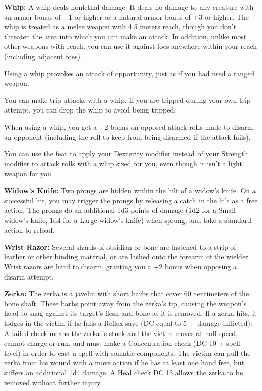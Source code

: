 \textbf{Whip:} A whip deals nonlethal damage. It deals no damage to any creature with an armor bonus of +1 or higher or a natural armor bonus of +3 or higher. The whip is treated as a melee weapon with 4.5 meters reach, though you don't threaten the area into which you can make an attack. In addition, unlike most other weapons with reach, you can use it against foes anywhere within your reach (including adjacent foes).

Using a whip provokes an attack of opportunity, just as if you had used a ranged weapon.

You can make trip attacks with a whip. If you are tripped during your own trip attempt, you can drop the whip to avoid being tripped.

When using a whip, you get a +2 bonus on opposed attack rolls made to disarm an opponent (including the roll to keep from being disarmed if the attack fails).

You can use the  feat to apply your Dexterity modifier instead of your Strength modifier to attack rolls with a whip sized for you, even though it isn't a light weapon for you. 

\textbf{Widow's Knife:} Two prongs are hidden within the hilt of a widow's knife. On a successful hit, you may trigger the prongs by releasing a catch in the hilt as a free action. The prongs do an additional 1d3 points of damage (1d2 for a Small widow's knife, 1d4 for a Large widow's knife) when sprung, and take a standard action to reload.

\textbf{Wrist Razor:} Several shards of obsidian or bone are fastened to a strip of leather or other binding material, or are lashed onto the forearm of the wielder. Wrist razors are hard to disarm, granting you a +2 bonus when opposing a disarm attempt.

\textbf{Zerka:} The zerka is a javelin with short barbs that cover 60 centimeters of the bone shaft. These barbs point away from the zerka's tip, causing the weapon's head to snag against its target's flesh and bone as it is removed. If a zerka hits, it lodges in the victim if he fails a Reflex save (DC equal to 5 + damage inflicted). A failed check means the zerka is stuck and the victim moves at half-speed, cannot charge or run, and must make a Concentration check (DC 10 + spell level) in order to cast a spell with somatic components. The victim can pull the zerka from his wound with a move action if he has at least one hand free, but suffers an additional 1d4 damage. A Heal check DC 13 allows the zerka to be removed without further injury.
